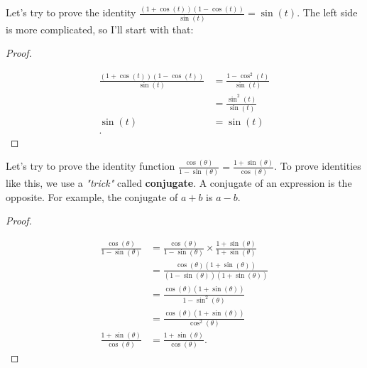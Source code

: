 Let's try to prove the identity
$\frac{(1 + \cos (t))(1 - \cos (t))}{\sin (t)} = \sin (t)$. The left side is
more complicated, so I'll start with that:

\begin{proof}
  \label{prf:1_cos_1_cos_over_sin_equals_sin}

  \begin{align*}
    \frac{(1 + \cos (t))(1 - \cos (t))}{\sin (t)} &= \frac{1 - \cos^{2} (t)}{\sin (t)} \\
                                                  &= \frac{\sin^{2} (t)}{\sin (t)} \\
                                         \sin (t) &= \sin (t) \\
  .\end{align*}
\end{proof}

Let's try to prove the identity function $\frac{\cos (\theta)}{1 - \sin
(\theta)} = \frac{1 + \sin (\theta)}{\cos (\theta)}$. To prove identities like
this, we use a \textit{"trick"} called \textbf{conjugate}. A conjugate of an
expression is the opposite. For example, the conjugate of $a + b$ is $a - b$.

\begin{proof}
  \label{prf:cos_1_sin_equals_1_sin_cos}

  \begin{align*}
    \frac{\cos (\theta)}{1 - \sin (\theta)} &= \frac{\cos (\theta)}{1 - \sin (\theta)} \times \frac{1 + \sin (\theta)}{1 + \sin (\theta)} \\
                                            &= \frac{\cos (\theta)(1 + \sin (\theta))}{(1 - \sin (\theta))(1 + \sin (\theta))} \\
                                            &= \frac{\cos (\theta)(1 + \sin (\theta))}{1 - \sin^{2} (\theta)} \\
                                            &= \frac{\cos (\theta)(1 + \sin (\theta))}{\cos^{2} (\theta)} \\
    \frac{1 + \sin (\theta)}{\cos (\theta)} &= \frac{1 + \sin (\theta)}{\cos (\theta)}
  .\end{align*}
\end{proof}

\newpage
